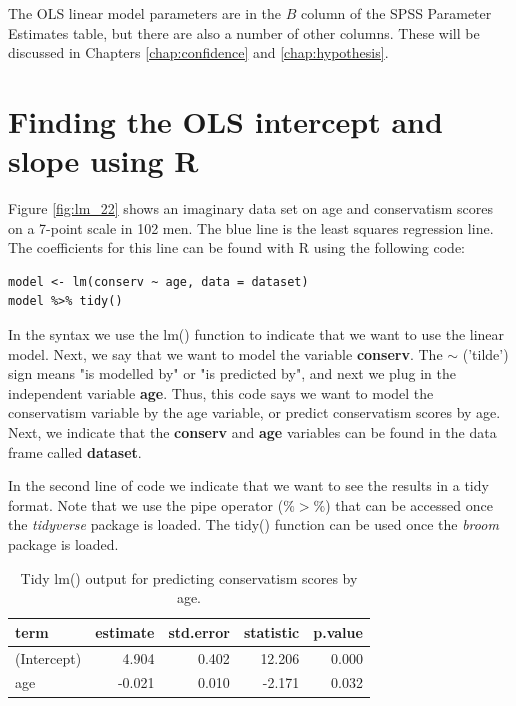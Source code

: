 \documentclass[]{book}\usepackage[]{graphicx}\usepackage[]{color}
\begin{document}
The OLS linear model parameters are in the $B$ column of the SPSS Parameter Estimates table, but there are also a number of other columns. These will be discussed in Chapters \ref{chap:confidence} and \ref{chap:hypothesis}. 


\section{Finding the OLS intercept and slope using R}

Figure \ref{fig:lm_22} shows an imaginary data set on age and conservatism scores on a 7-point scale in 102 men. The blue line is the least squares regression line. The coefficients for this line can be found with R using the following code:

\begin{lstlisting}
model <- lm(conserv ~ age, data = dataset)
model %>% tidy()
\end{lstlisting}

In the syntax we use the lm() function to indicate that we want to use the linear model. Next, we say that we want to model the variable \textbf{conserv}. The $\sim$ ('tilde') sign means "is modelled by" or "is predicted by", and next we plug in the independent variable \textbf{age}. Thus, this code says we want to model the conservatism variable by the age variable, or predict conservatism scores by age. Next, we indicate that the \textbf{conserv} and \textbf{age} variables can be found in the data frame called \textbf{dataset}.

In the second line of code we indicate that we want to see the results in a tidy format. Note that we use the pipe operator ($\%>\%$) that can be accessed once the \textit{tidyverse} package is loaded. The tidy() function can be used once the \textit{broom} package is loaded.

\begin{table}[ht]
\centering
\caption{Tidy lm() output for predicting conservatism scores by age.} 
\label{tab:out_conserv_r}
\begin{tabular}{lrrrr}
  \hline
term & estimate & std.error & statistic & p.value \\ 
  \hline
(Intercept) & 4.904 & 0.402 & 12.206 & 0.000 \\ 
  age & -0.021 & 0.010 & -2.171 & 0.032 \\ 
   \hline
\end{tabular}
\end{table}
\end{document}
